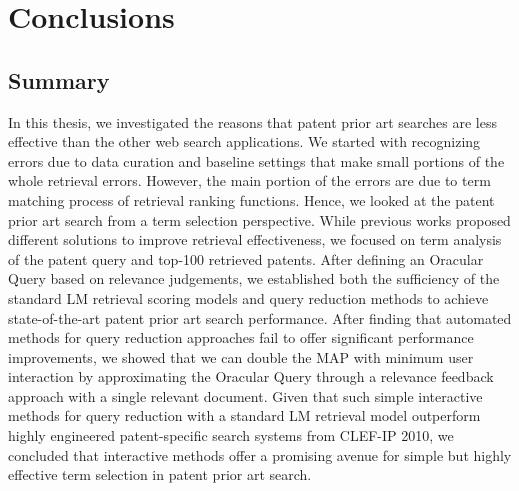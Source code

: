 \chapter{Conclusions}
\label{cha:conc}

\section{Summary}
\label{sec:summary}

In this thesis, we investigated the reasons that patent prior art searches 
are less effective than the other web search applications.
We started with recognizing errors due to data curation and baseline settings that 
make small portions of the whole retrieval errors. However, the main portion of the errors are 
due to term matching process of retrieval ranking functions. 
Hence, we looked at the patent prior art search from
a term selection perspective. While previous works proposed
different solutions to improve retrieval effectiveness, we 
focused on term analysis of the patent query and top-100 retrieved patents. 
After defining an Oracular Query based on
relevance judgements, we established both the sufficiency
of the standard LM retrieval scoring models and query reduction 
methods to achieve state-of-the-art patent prior art
search performance. After finding that automated methods 
for query reduction approaches fail to offer significant
performance improvements, we showed that we can double
the MAP with minimum user interaction by approximating
the Oracular Query through a relevance feedback approach
with a single relevant document. Given that such simple 
interactive methods for query reduction with a standard LM
retrieval model outperform highly engineered patent-specific
search systems from CLEF-IP 2010, we concluded that interactive 
methods offer a promising avenue for simple but
highly effective term selection in patent prior art search.
 

